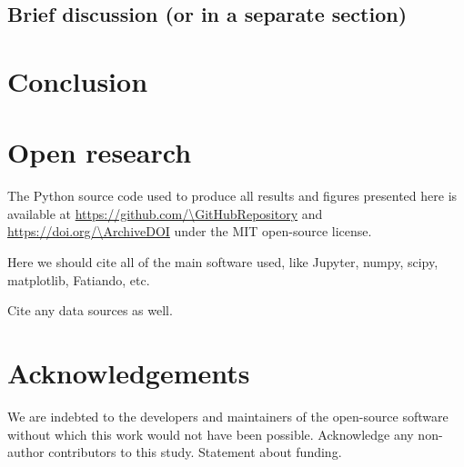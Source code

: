 \subsection{Brief discussion (or in a separate section)}



\section{Conclusion}

\lipsum[1]


\section{Open research}

The Python source code used to produce all results and figures presented here
is available at \url{https://github.com/\GitHubRepository} and
\url{https://doi.org/\ArchiveDOI} under the MIT open-source license.

Here we should cite all of the main software used, like Jupyter, numpy, scipy,
matplotlib, Fatiando, etc.

Cite any data sources as well.

\section{Acknowledgements}

We are indebted to the developers and maintainers of the open-source software
without which this work would not have been possible.
Acknowledge any non-author contributors to this study.
Statement about funding.

